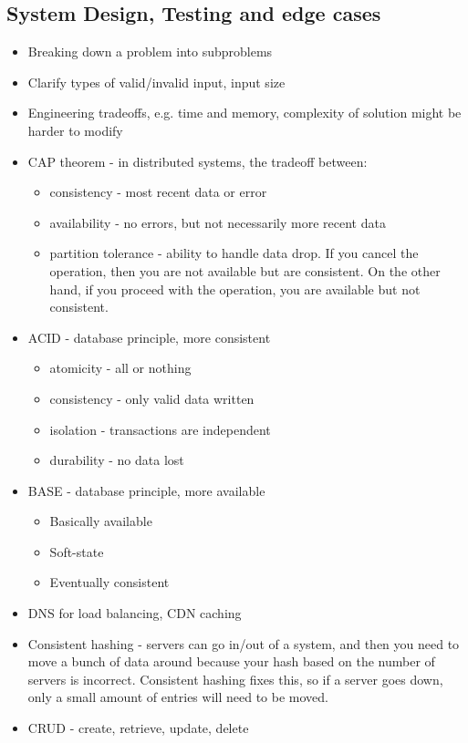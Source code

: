 \documentclass[10pt]{article}
\begin{document}
\subsection{System Design, Testing and edge cases}
\begin{itemize}
    \itemsep0em
    \item Breaking down a problem into subproblems
    \item Clarify types of valid/invalid input, input size
    \item Engineering tradeoffs, e.g. time and memory, complexity of solution might be harder to modify
    \item CAP theorem - in distributed systems, the tradeoff between:
    \begin{itemize}
        \item consistency - most recent data or error
        \item availability - no errors, but not necessarily more recent data
        \item partition tolerance - ability to handle data drop. If you cancel the operation, then you are not available but are consistent. On the other hand, if you proceed with the operation, you are available but not consistent.
    \end{itemize}
    \item ACID - database principle, more consistent
    \begin{itemize}
        \item atomicity - all or nothing
        \item consistency - only valid data written
        \item isolation - transactions are independent
        \item durability - no data lost
    \end{itemize}
    \item BASE - database principle, more available
    \begin{itemize}
        \item Basically available
        \item Soft-state
        \item Eventually consistent
    \end{itemize}
    \item DNS for load balancing, CDN caching
    \item Consistent hashing - servers can go in/out of a system, and then you need to move a bunch of data around because your hash based on the number of servers is incorrect. Consistent hashing fixes this, so if a server goes down, only a small amount of entries will need to be moved.
    \item CRUD - create, retrieve, update, delete
\end{itemize}
\end{document}
